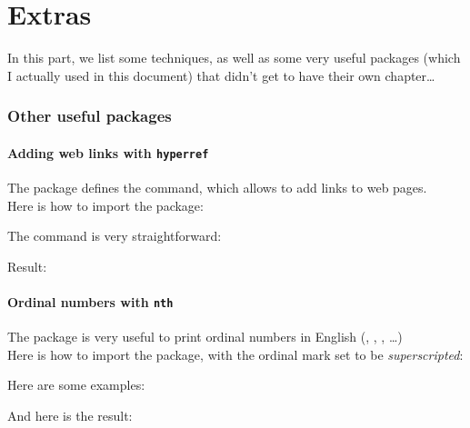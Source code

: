 
\part{Extras}

In this part, we list some techniques, as well as some very useful packages (which I actually used in this document) that didn't get to have their own chapter\dots


\section{Other useful packages}

\subsection{Adding web links with \texttt{hyperref}}

The  package defines the  command, which allows to add links to web pages. \\

Here is how to import the package:


\bigskip

The  command is very straightforward:


Result: \\



\bigskip


\subsection{Ordinal numbers with \texttt{nth}}

The  package is very useful to print ordinal numbers in English (, , , \dots)\\

Here is how to import the package, with the ordinal mark set to be \emph{superscripted}:


Here are some examples:


And here is the result: \\
\\


